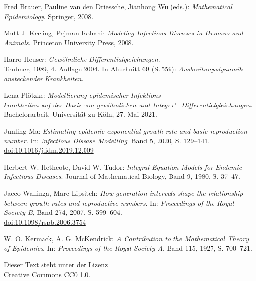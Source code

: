 \documentclass[a4paper,10pt,fleqn,twocolumn,twoside,dvipdfmx]{scrartcl}
\numberwithin{equation}{section}
\begin{document}
\newpage
\begin{thebibliography}{00}
 Fred Brauer, Pauline van den Driessche,
Jianhong Wu (eds.): \emph{Mathematical Epidemiology}. Springer, 2008.

 Matt J. Keeling, Pejman Rohani:
\emph{Modeling Infectious Diseases in Humans and Animals}.
Princeton University Press, 2008.

 Harro Heuser: \emph{Gewöhnliche Differentialgleichungen}.\\
Teubner, 1989, 4. Auflage 2004. In Abschnitt 69 (S.\,559):
\emph{Ausbreitungsdynamik ansteckender Krankheiten}.

 Lena Plötzke: \emph{Modellierung epidemischer
Infektions-\\ krankheiten auf der Basis von gewöhnlichen und
Integro"=Differentialgleichungen}. Bachelorarbeit, Universität zu Köln,
27. Mai 2021.

 Junling Ma: \emph{Estimating epidemic exponential growth
rate and basic reproduction number}. In: \emph{Infectious Disease Modelling},
Band 5, 2020, S. 129--141.\\
\href{https://doi.org/10.1016/j.idm.2019.12.009}%
{doi:10.1016/j.idm.2019.12.009}

 Herbert W. Hethcote, David W. Tudor:
\emph{Integral Equation Models for Endemic Infectious Diseases}.
Journal of Mathematical Biology, Band 9, 1980, S. 37--47.

 Jacco Wallinga, Marc Lipsitch:
\emph{How generation intervals shape the relationship
between growth rates and reproductive numbers}.
In: \emph{Proceedings of the Royal Society B}, Band 274, 2007, S. 599--604.\\
\href{https://doi.org/10.1098/rspb.2006.3754}{doi:10.1098/rspb.2006.3754}

 W. O. Kermack, A. G. McKendrick:
\emph{A Contribution to the Mathematical Theory of Epidemics}.
In: \emph{Proceedings of the Royal Society A}, Band 115, 1927, S. 700--721.
\end{thebibliography}
\vfill

\noindent
{\small Dieser Text steht unter der Lizenz\\
Creative Commons CC0 1.0.}
\end{document}
